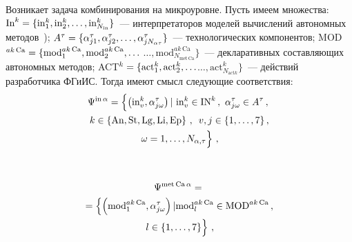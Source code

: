 \begin{multicols}{2}
  Возникает задача комбинирования на мик\-ро\-уровне. Пусть имеем множества: 
$\mathrm{In}^k\hm= \{ \mathrm{in}_1^k, \mathrm{in}_2^k,\ldots, 
\mathrm{in}^k_{N_{\mathrm{in}}}\}$~--- интерпретаторов моделей вычислений автономных 
методов~\cite{11-kir, 17-kir}); $A^\tau\hm= \{\alpha^\tau_{j1}, \alpha^\tau_{j2},\ldots, 
\alpha^\tau_{jN_{\alpha\tau}}\}$~--- технологических компонентов; 
MOD$^{ak\,\mathrm{Ca}}\hm= \{ 
\mathrm{mod}_1^{ak\,\mathrm{Ca}}, \mathrm{mod}_2^{ak\,\mathrm{Ca}}, \ldots$\linebreak
$\ldots,  
\mathrm{mod}_{N_{\mathrm{met\,Ca}}}^{ak\,\mathrm{Ca}}\}$~--- декларативных составляющих автономных методов; 
ACT$^k\hm= \{\mathrm{act}_1^k, \mathrm{act}_2^k,\ldots$\linebreak $\ldots , 
\mathrm{act}^k_{N_{\mathrm{act}k}}\}$~--- действий разработчика ФГиИС. Тогда имеют 
смысл следующие соответствия:
  \begin{multline*}
  \Psi^{\mathrm{in}\,\alpha} =  \left\{ \left( \mathrm{in}_v^k, \alpha^\tau_{j\omega} 
  \right) \vert \,\,
\mathrm{in}^k_v \in \mathrm{IN}^k\,,\ \alpha^\tau_{j\omega} \in A^\tau\,,\right.\\
 k\in \left\{ \mathrm{An},\mathrm{St},\mathrm{Lg},\mathrm{Li},\mathrm{Ep}\right\}\,,\enskip
 v,j\in \{1,\ldots, 7\}\,,\\
   \left.\omega= 1,\ldots, N_{\alpha,\tau}
  \vphantom{\left( \mathrm{in}_v^k, \alpha^\tau_{j\omega} \right) \mathrm{IN}^k}
  \right\}\,,
  \end{multline*}
  
  \begin{figure*}[b] %
\vspace*{1pt}
 \begin{center}
 \mbox{%
 \epsfxsize=150.888mm
 }
 \end{center}
 \vspace*{-9pt}
\end{figure*}

 
\noindent
   \begin{multline*}
  \Psi^{\mathrm{met\,Ca}\,\alpha} = {}\\
  {}=\left\{ \left( \mathrm{mod}_1^{ak\,\mathrm{Ca}},\alpha^\tau_{j\omega}\right) 
\vert \mathrm{mod}_l^{ak\,\mathrm{Ca}} \in \mathrm{MOD}^{ak\,\mathrm{Ca}}\,,\right.\\
\left. l\in \{1,\ldots, 7\}
\vphantom{\left( \mathrm{mod}_1^{ak\,Ca},\alpha^\tau_{j\omega}\right) }
\right\}\,,
\end{multline*}




\end{multicols}
